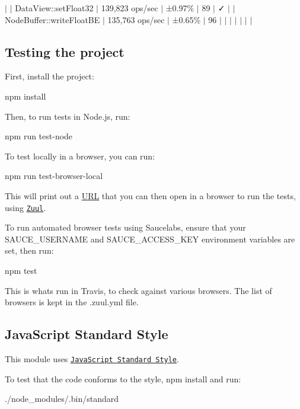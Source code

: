 $\vert$ $\vert$ Data\+View\+::set\+Float32 $\vert$ 139,823 ops/sec $\vert$ ±0.97\% $\vert$ 89 $\vert$ ✓ $\vert$ $\vert$ Node\+Buffer\+::write\+Float\+BE $\vert$ 135,763 ops/sec $\vert$ ±0.65\% $\vert$ 96 $\vert$ $\vert$ $\vert$ $\vert$ $\vert$ $\vert$ $\vert$

\subsection*{Testing the project}

First, install the project\+: \begin{DoxyVerb}npm install
\end{DoxyVerb}


Then, to run tests in Node.\+js, run\+: \begin{DoxyVerb}npm run test-node
\end{DoxyVerb}


To test locally in a browser, you can run\+: \begin{DoxyVerb}npm run test-browser-local
\end{DoxyVerb}


This will print out a \mbox{\hyperlink{namespace_u_r_l}{U\+RL}} that you can then open in a browser to run the tests, using \href{https://github.com/defunctzombie/zuul}{\tt Zuul}.

To run automated browser tests using Saucelabs, ensure that your {\ttfamily S\+A\+U\+C\+E\+\_\+\+U\+S\+E\+R\+N\+A\+ME} and {\ttfamily S\+A\+U\+C\+E\+\_\+\+A\+C\+C\+E\+S\+S\+\_\+\+K\+EY} environment variables are set, then run\+: \begin{DoxyVerb}npm test
\end{DoxyVerb}


This is what\textquotesingle{}s run in Travis, to check against various browsers. The list of browsers is kept in the {\ttfamily .zuul.\+yml} file.

\subsection*{Java\+Script Standard Style}

This module uses \href{https://github.com/feross/standard}{\tt Java\+Script Standard Style}.

\href{https://github.com/feross/standard}{\tt }

To test that the code conforms to the style, {\ttfamily npm install} and run\+: \begin{DoxyVerb}./node_modules/.bin/standard
\end{DoxyVerb}



